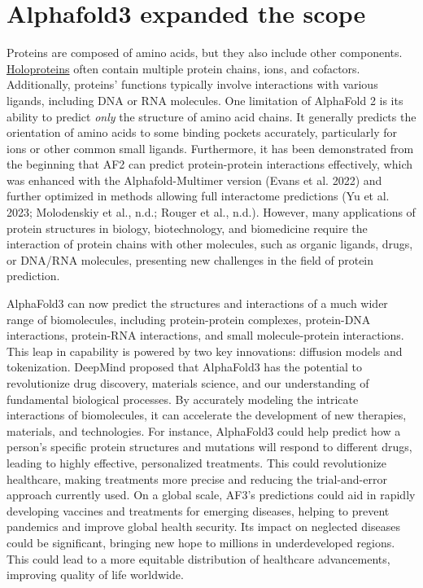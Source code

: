 \documentclass[
]{scrbook}
\begin{document}
\chapter{Alphafold3 expanded the
scope}\label{alphafold3-expanded-the-scope}

Proteins are composed of amino acids, but they also include other
components.
\href{https://en.wikipedia.org/wiki/Holoprotein}{Holoproteins} often
contain multiple protein chains, ions, and cofactors. Additionally,
proteins' functions typically involve interactions with various ligands,
including DNA or RNA molecules. One limitation of AlphaFold 2 is its
ability to predict \emph{only} the structure of amino acid chains. It
generally predicts the orientation of amino acids to some binding
pockets accurately, particularly for ions or other common small ligands.
Furthermore, it has been demonstrated from the beginning that AF2 can
predict protein-protein interactions effectively, which was enhanced
with the Alphafold-Multimer version (Evans et al. 2022) and further
optimized in methods allowing full interactome predictions (Yu et al.
2023; Molodenskiy et al., n.d.; Rouger et al., n.d.). However, many
applications of protein structures in biology, biotechnology, and
biomedicine require the interaction of protein chains with other
molecules, such as organic ligands, drugs, or DNA/RNA molecules,
presenting new challenges in the field of protein prediction.

AlphaFold3 can now predict the structures and interactions of a much
wider range of biomolecules, including protein-protein complexes,
protein-DNA interactions, protein-RNA interactions, and small
molecule-protein interactions. This leap in capability is powered by two
key innovations: diffusion models and tokenization. DeepMind proposed
that AlphaFold3 has the potential to revolutionize drug discovery,
materials science, and our understanding of fundamental biological
processes. By accurately modeling the intricate interactions of
biomolecules, it can accelerate the development of new therapies,
materials, and technologies. For instance, AlphaFold3 could help predict
how a person's specific protein structures and mutations will respond to
different drugs, leading to highly effective, personalized treatments.
This could revolutionize healthcare, making treatments more precise and
reducing the trial-and-error approach currently used. On a global scale,
AF3's predictions could aid in rapidly developing vaccines and
treatments for emerging diseases, helping to prevent pandemics and
improve global health security. Its impact on neglected diseases could
be significant, bringing new hope to millions in underdeveloped regions.
This could lead to a more equitable distribution of healthcare
advancements, improving quality of life worldwide.
\end{document}
